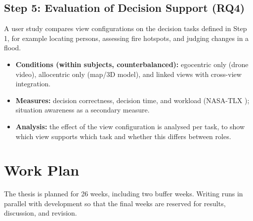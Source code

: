 \documentclass{article}
\begin{document}
\subsection{Step 5: Evaluation of Decision Support (RQ4)}
A user study compares view configurations on the decision tasks defined in Step 1, for example locating persons, assessing fire hotspots, and judging changes in a flood.
\begin{itemize}
  \item \textbf{Conditions (within subjects, counterbalanced):} egocentric only (drone video), allocentric only (map/3D model), and linked views with cross-view integration.
  \item \textbf{Measures:} decision correctness, decision time, and workload (NASA-TLX \cite{hart1988}); situation awareness \cite{endsley1995} as a secondary measure.
  \item \textbf{Analysis:} the effect of the view configuration is analysed per task, to show which view supports which task and whether this differs between roles.
\end{itemize}


\section{Work Plan}

The thesis is planned for 26 weeks, including two buffer weeks. Writing runs in parallel with development so that the final weeks are reserved for results, discussion, and revision.
\end{document}
